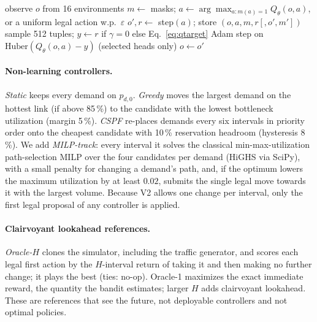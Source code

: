 \begin{algorithm}[t]
\caption{Masked value learner (bandit for $\gamma=0$). Source:
\texttt{experiments/masked\_bandit.py}, \texttt{study/learners.py}.}
\label{alg:value}
\small
\begin{algorithmic}[1]
\State observe $o$ from 16 environments
  \State $m\gets$ masks; $a\gets\arg\max_{a:m(a)=1}Q_\theta(o,a)$, or a uniform legal action w.p.\ $\varepsilon$
  \State $o',r\gets$ step$(a)$; store $(o,a,m,r[,o',m'])$
    \State sample 512 tuples; $y\gets r$ if $\gamma=0$ else Eq.~\eqref{eq:qtarget}
    \State Adam step on $\mathrm{Huber}(Q_\theta(o,a)-y)$ (selected heads only)
  \EndIf
  \State $o\gets o'$
\EndFor
\end{algorithmic}
\end{algorithm}

\paragraph{Non-learning controllers.}
\emph{Static} keeps every demand on $p_{d,0}$. \emph{Greedy} moves the largest
demand on the hottest link (if above 85\,\%) to the candidate with the lowest
bottleneck utilization (margin 5\,\%). \emph{CSPF} re-places demands every six
intervals in priority order onto the cheapest candidate with 10\,\% reservation
headroom (hysteresis 8\,\%). We add \emph{MILP-track}: every interval it solves
the classical min-max-utilization path-selection MILP over the four candidates
per demand (HiGHS via SciPy), with a small penalty for changing a demand's
path, and, if the optimum lowers the maximum utilization by at least $0.02$,
submits the single legal move towards it with the largest volume. Because V2
allows one change per interval, only the first legal proposal of any
controller is applied.

\paragraph{Clairvoyant lookahead references.}
\emph{Oracle-$H$} clones the simulator, including the traffic generator, and
scores each legal first action by the $H$-interval return of taking it and
then making no further change; it plays the best (ties: no-op). Oracle-1
maximizes the exact immediate reward, the quantity the bandit estimates; larger
$H$ adds clairvoyant lookahead. These are references that see the future, not
deployable controllers and not optimal policies.

